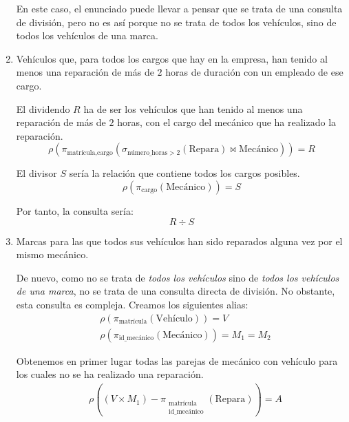 \begin{ejercicio}
\begin{enumerate}
        \begin{observacion}
            En este caso, el enunciado puede llevar a pensar que se trata de una consulta de división, pero no es así porque no se trata de todos los vehículos, sino de todos los vehículos de una marca.
        \end{observacion}

        \item Vehículos que, para todos los cargos que hay en la empresa, han tenido al menos una reparación de más de $2$ horas de duración con un empleado de ese cargo.
        
        El dividendo $R$ ha de ser los vehículos que han tenido al menos una reparación de más de $2$ horas, con el cargo del mecánico que ha realizado la reparación.
        \begin{equation*}
            \rho\left(\pi_{\text{matrícula},\text{cargo}}(\sigma_{\text{número\_horas} > 2}(\text{Repara})\bowtie \text{Mecánico})\right) = R
        \end{equation*}

        El divisor $S$ sería la relación que contiene todos los cargos posibles.
        \begin{equation*}
            \rho(\pi_{\text{cargo}}(\text{Mecánico})) = S
        \end{equation*}

        Por tanto, la consulta sería:
        \begin{equation*}
            R \div S
        \end{equation*}

        \item Marcas para las que todos sus vehículos han sido reparados alguna vez por el mismo mecánico.
        
        De nuevo, como no se trata de \emph{todos los vehículos} sino de \emph{todos los vehículos de una marca}, no se trata de una consulta directa de división. No obstante, esta consulta es compleja. Creamos los siguientes alias:
        \begin{align*}
            & \rho(\pi_{\text{matrícula}}(\text{Vehículo}))=V\\
            & \rho(\pi_{\text{id\_mecánico}}(\text{Mecánico}))=M_1=M_2
        \end{align*}

        Obtenemos en primer lugar todas las parejas de mecánico con vehículo para los cuales no se ha realizado una reparación.
        \begin{align*}
            &\rho\left((V\times M_1) - \pi_{\substack{\text{matrícula}\\\text{id\_mecánico}}}(\text{Repara})\right)=A
        \end{align*}


\end{enumerate}
\end{ejercicio}
